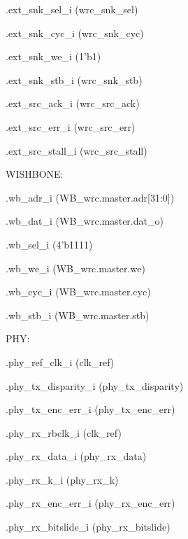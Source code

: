 \begin{dig}
\begin{dig}
\begin{dig}
\begin{dig}
            \item .ext\_snk\_sel\_i              (wrc\_snk\_sel)
            \item .ext\_snk\_cyc\_i              (wrc\_snk\_cyc)
            \item .ext\_snk\_we\_i               (1'b1)
            \item .ext\_snk\_stb\_i              (wrc\_snk\_stb)
            \item 
            \item .ext\_src\_ack\_i              (wrc\_src\_ack)
            \item .ext\_src\_err\_i              (wrc\_src\_err)
            \item .ext\_src\_stall\_i            (wrc\_src\_stall)
            \end{dig}
        \item WISHBONE:
            \begin{dig}
            \item .wb\_adr\_i                   (WB\_wrc.master.adr[31:0])
            \item .wb\_dat\_i                   (WB\_wrc.master.dat\_o)
            \item .wb\_sel\_i                   (4'b1111)
            \item .wb\_we\_i                    (WB\_wrc.master.we)
            \item .wb\_cyc\_i                   (WB\_wrc.master.cyc)
            \item .wb\_stb\_i                   (WB\_wrc.master.stb)
            \end{dig}
        \item PHY:
            \begin{dig}
            \item .phy\_ref\_clk\_i              (clk\_ref)
            \item .phy\_tx\_disparity\_i         (phy\_tx\_disparity)
            \item .phy\_tx\_enc\_err\_i           (phy\_tx\_enc\_err)
            \item .phy\_rx\_rbclk\_i             (clk\_ref)
            \item .phy\_rx\_data\_i              (phy\_rx\_data)
            \item .phy\_rx\_k\_i                 (phy\_rx\_k)
            \item .phy\_rx\_enc\_err\_i           (phy\_rx\_enc\_err)
            \item .phy\_rx\_bitslide\_i          (phy\_rx\_bitslide)

\end{dig}
\end{dig}
\end{dig}
\end{dig}
